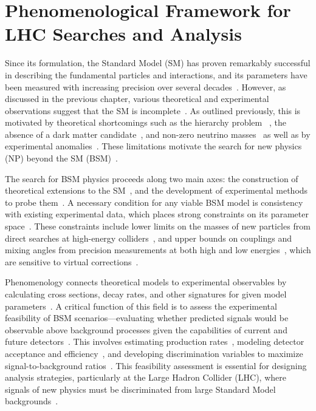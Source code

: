 \chapter[Phenomenological Framework]{Phenomenological Framework for LHC Searches and Analysis}\label{ch:pheno}

Since its formulation, the Standard Model (SM) has proven remarkably successful in describing the fundamental particles and interactions, and its parameters have been measured with increasing precision over several decades~\cite{1674-1137-40-10-100001,PhysRevLett.19.1264}. However, as discussed in the previous chapter, various theoretical and experimental observations suggest that the SM is incomplete~\cite{Nilles1984,Dorsner:2016wpm}. As outlined previously, this is motivated by theoretical shortcomings such as the hierarchy problem~\cite{Randall:1999ee,Giudice2013_review} , the absence of a dark matter candidate~\cite{Bertone2005_DM_review}, and non-zero neutrino masses~\cite{Mohapatra:1985xm} as well as by experimental anomalies~\cite{LHCb:2014vgu,LHCb:2017avl,BaBar:2012obs}. These limitations motivate the search for new physics (NP) beyond the SM (BSM)~\cite{Dorsner:2016wpm,Buttazzo:2017ixm}.

The search for BSM physics proceeds along two main axes: the construction of theoretical extensions to the SM~\cite{Dorsner:2016wpm,Buttazzo:2017ixm,Giudice2013_review}, and the development of experimental methods to probe them~\cite{Alwall:2014hca,Alloul:2013bka,deFavereau:2013fsa}. A necessary condition for any viable BSM model is consistency with existing experimental data, which places strong constraints on its parameter space~\cite{1674-1137-40-10-100001,ATLAS:2019erb,CMS:2021ctt}. These constraints include lower limits on the masses of new particles from direct searches at high-energy colliders~\cite{ATLAS:2019erb,CMS:2021ctt}, and upper bounds on couplings and mixing angles from precision measurements at both high and low energies~\cite{Schael_2006,Altmannshofer_2015}, which are sensitive to virtual corrections~\cite{Ciuchini:2022wbq}.


Phenomenology connects theoretical models to experimental observables by calculating cross sections, decay rates, and other signatures for given model parameters~\cite{Alwall:2014hca,Sjostrand:2014zea,Cacciari:2011ma}. A critical function of this field is to assess the experimental feasibility of BSM scenarios—evaluating whether predicted signals would be observable above background processes given the capabilities of current and future detectors~\cite{deFavereau:2013fsa,Alwall:2014hca,Alloul:2013bka}. This involves estimating production rates~\cite{Alwall:2014hca,Sjostrand:2014zea,NNPDF:2014otw}, modeling detector acceptance and efficiency~\cite{deFavereau:2013fsa,ATLAS:2008xda,CMS:2008xjf,lumiRef}, and developing discrimination variables to maximize signal-to-background ratios~\cite{pedregosa_scikit-learn_2011,Chen2016,Bols_2020,CMS_DeepTau}. This feasibility assessment is essential for designing analysis strategies, particularly at the Large Hadron Collider (LHC), where signals of new physics must be discriminated from large Standard Model backgrounds~\cite{deFavereau:2013fsa,Alwall:2014hca}.

